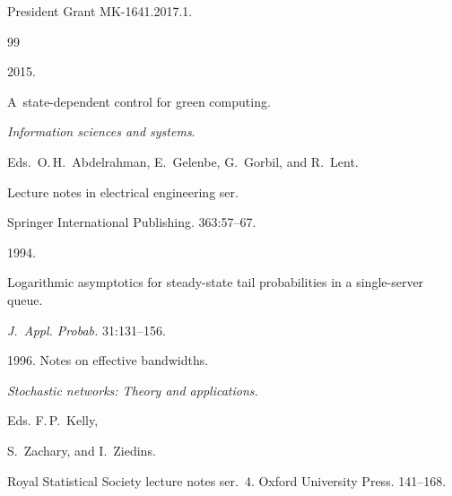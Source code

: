 President Grant MK-1641.2017.1.


 








\renewcommand{\bibname}{\protect\rmfamily References}







{\small\frenchspacing


{%




\begin{thebibliography}{99}







 2015. 


A~state-dependent control for green computing. 


\textit{Information sciences and systems}.


Eds.\ O.\,H.~Abdelrahman, E.~Gelenbe, G.~Gorbil, and R.~Lent.


 Lecture notes in electrical engineering ser. 


Springer International Publishing. 363:57--67.







 1994. 


Logarithmic asymptotics for steady-state tail probabilities in a single-server queue. 


\textit{J.~Appl. Probab.} 31:131--156.







 1996. Notes on effective bandwidths. 


\textit{Stochastic networks: Theory and applications.} 


Eds. F.\,P.~Kelly,


S.~Zachary, and I.~Ziedins.


Royal Statistical Society lecture notes ser.~4. Oxford University Press. 141--168.






\end{thebibliography}}}

